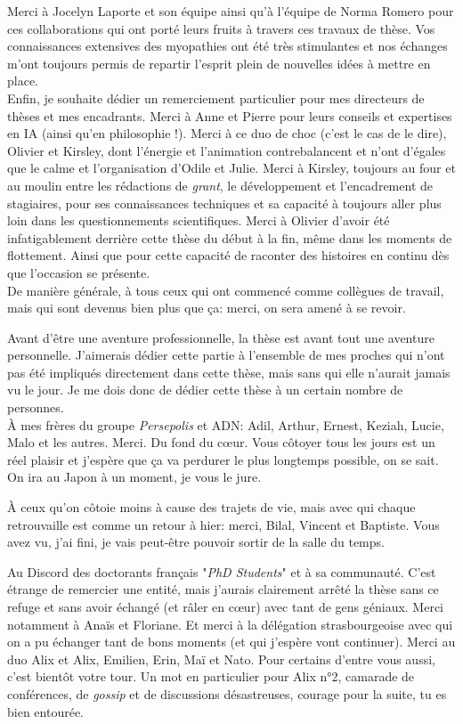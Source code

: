 Merci à Jocelyn Laporte et son équipe ainsi qu'à l'équipe de Norma Romero pour ces collaborations qui ont porté leurs fruits à travers ces travaux de thèse. Vos connaissances extensives des myopathies ont été très stimulantes et nos échanges m'ont toujours permis de repartir l'esprit plein de nouvelles idées à mettre en place. \\

Enfin, je souhaite dédier un remerciement particulier pour mes directeurs de thèses et mes encadrants. Merci à Anne et Pierre pour leurs conseils et expertises en IA (ainsi qu'en philosophie !). Merci à ce duo de choc (c'est le cas de le dire), Olivier et Kirsley, dont l'énergie et l'animation contrebalancent et n'ont d'égales que le calme et l'organisation d'Odile et Julie. Merci à Kirsley, toujours au four et au moulin entre les rédactions de \textit{grant}, le développement et l'encadrement de stagiaires, pour ses connaissances techniques et sa capacité à toujours aller plus loin dans les questionnements scientifiques. Merci à Olivier d'avoir été infatigablement derrière cette thèse du début à la fin, même dans les moments de flottement. Ainsi que pour cette capacité de raconter des histoires en continu dès que l'occasion se présente. \\

De manière générale, à tous ceux qui ont commencé comme collègues de travail, mais qui sont devenus bien plus que ça: merci, on sera amené à se revoir. 

Avant d'être une aventure professionnelle, la thèse est avant tout une aventure personnelle. J'aimerais dédier cette partie à l'ensemble de mes proches qui n'ont pas été impliqués directement dans cette thèse, mais sans qui elle n'aurait jamais vu le jour. Je me dois donc de dédier cette thèse à un certain nombre de personnes. \\

À mes frères du groupe \textit{Persepolis} et ADN: Adil, Arthur, Ernest, Keziah, Lucie, Malo et les autres. Merci. Du fond du cœur. Vous côtoyer tous les jours est un réel plaisir et j'espère que ça va perdurer le plus longtemps possible, on se sait. On ira au Japon à un moment, je vous le jure.

À ceux qu'on côtoie moins à cause des trajets de vie, mais avec qui chaque retrouvaille est comme un retour à hier: merci, Bilal, Vincent et Baptiste. Vous avez vu, j'ai fini, je vais peut-être pouvoir sortir de la salle du temps.

Au Discord des doctorants français "\textit{PhD Students}" et à sa communauté. C'est étrange de remercier une entité, mais j'aurais clairement arrêté la thèse sans ce refuge et sans avoir échangé (et râler en cœur) avec tant de gens géniaux. Merci notamment à Anaïs et Floriane. Et merci à la délégation strasbourgeoise avec qui on a pu échanger tant de bons moments (et qui j'espère vont continuer). Merci au duo Alix et Alix, Emilien, Erin, Maï et Nato. Pour certains d'entre vous aussi, c'est bientôt votre tour. Un mot en particulier pour Alix n°2, camarade de conférences, de \textit{gossip} et de discussions désastreuses, courage pour la suite, tu es bien entourée.

